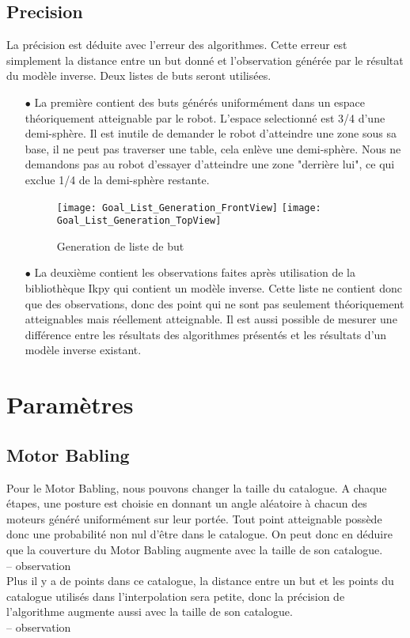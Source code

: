 \documentclass[11pt,french]{report}
\begin{document}
\subsection{Precision}
La précision est déduite avec l'erreur des algorithmes. Cette erreur est simplement la distance entre un but donné et l'observation générée par le résultat du modèle inverse. Deux listes de buts seront utilisées.
\begin{itemize}
    \item[$\bullet$] La première contient des buts générés uniformément dans un espace théoriquement atteignable par le robot. L'espace selectionné est 3/4 d'une demi-sphère. Il est inutile de demander le robot d'atteindre une zone sous sa base, il ne peut pas traverser une table, cela enlève une demi-sphère. Nous ne demandons pas au robot d'essayer d'atteindre une zone "derrière lui", ce qui exclue 1/4 de la demi-sphère restante.
    
    \begin{figure}
        \centering
        \texttt{[image: Goal\_List\_Generation\_FrontView]} \texttt{[image: Goal\_List\_Generation\_TopView]}
        \caption{Generation de liste de but}
        \label{fig:goal_list}
    \end{figure}
    
    \item[$\bullet$] La deuxième contient les observations faites après utilisation de la bibliothèque Ikpy qui contient un modèle inverse. Cette liste ne contient donc que des observations, donc des point qui ne sont pas seulement théoriquement atteignables mais réellement atteignable. Il est aussi possible de mesurer une différence entre les résultats des algorithmes présentés et les résultats d'un modèle inverse existant.
\end{itemize}

\section{Paramètres}

\subsection{Motor Babling}

Pour le Motor Babling, nous pouvons changer la taille du catalogue. A chaque étapes, une posture est choisie en donnant un angle aléatoire à chacun des moteurs généré uniformément sur leur portée. Tout point atteignable possède donc une probabilité non nul d'être dans le catalogue. On peut donc en déduire que la couverture du Motor Babling augmente avec la taille de son catalogue.\\
-- observation\\
Plus il y a de points dans ce catalogue, la distance entre un but et les points du catalogue utilisés dans l'interpolation sera petite, donc la précision de l'algorithme augmente aussi avec la taille de son catalogue.\\
-- observation
\end{document}
